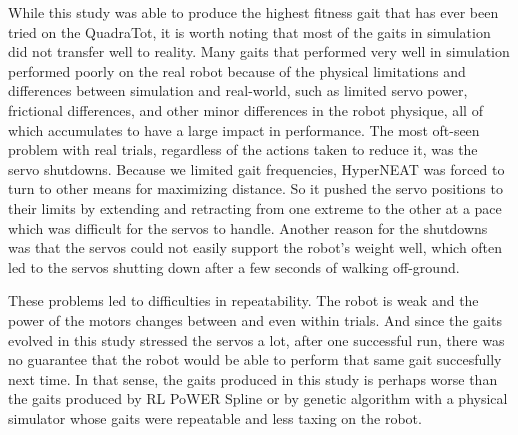 While this study was able to produce the highest fitness gait that has ever been tried on the QuadraTot, it is worth noting that most of the gaits in simulation did not transfer well to reality. 
Many gaits that performed very well in simulation performed poorly on the real robot because of the physical limitations and differences between simulation and real-world, such as limited servo power, frictional differences, and other minor differences in the robot physique, all of which accumulates to have a large impact in performance.
The most oft-seen problem with real trials, regardless of the actions taken to reduce it, was the servo shutdowns. 
Because we limited gait frequencies, HyperNEAT was forced to turn to other means for maximizing distance. 
So it pushed the servo positions to their limits by extending and retracting from one extreme to the other at a pace which was difficult for the servos to handle. 
Another reason for the shutdowns was that the servos could not easily support the robot's weight well, which often led to the servos shutting down after a few seconds of walking off-ground. 

These problems led to difficulties in repeatability. 
The robot is weak and the power of the motors changes between and even within trials. 
And since the gaits evolved in this study stressed the servos a lot, after one successful run, there was no guarantee that the robot would be able to perform that same gait succesfully next time. 
In that sense, the gaits produced in this study is perhaps worse than the gaits produced by RL PoWER Spline \cite{haocheng} or by genetic algorithm with a physical simulator \cite{glette} whose gaits were repeatable and less taxing on the robot. 


